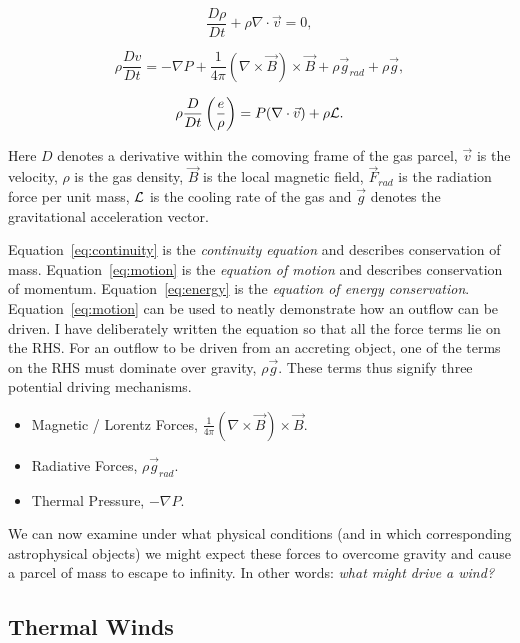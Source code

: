 \begin{equation}
\label{eq:continuity}
\frac{D \rho}{Dt} + \rho \nabla \cdot \vec{v} = 0,
\end{equation}

\begin{equation}
\label{eq:motion}
\rho \frac{Dv}{Dt} = -\nabla P + \frac{1}{4 \pi}(\nabla \times \vec{B}) \times \vec{B} + \rho \vec{g}_{rad} + \rho \vec{g},
\end{equation}

\begin{equation}
\label{eq:energy}
\rho \frac{D}{Dt} \left(\frac{e}{\rho}\right) = P (\nabla \cdot \vec{v}) + \rho \cal{L}.
\end{equation}

Here $D$ denotes a derivative within the comoving frame of the gas parcel, $\vec{v}$ is the velocity,
$\rho$ is the gas density, $\vec{B}$ is the local magnetic field, 
$\vec{F}_{rad}$ is the radiation
force per unit mass, $\cal{L}$ is the cooling rate of the gas 
and $\vec{g}$ denotes the gravitational acceleration vector.

Equation~\ref{eq:continuity} is the {\em continuity equation} and describes conservation of mass. 
Equation~\ref{eq:motion} is the {\em equation of motion} and describes conservation of momentum.
Equation~\ref{eq:energy} is the {\em equation of energy conservation}. 
Equation~\ref{eq:motion} can be used to neatly demonstrate how an outflow can be driven. I have 
deliberately written the equation so that all the force terms lie on the RHS. 
For an outflow to be driven from an accreting object, one of the terms on the RHS must
dominate over gravity, $\rho \vec{g}$. These terms thus signify three potential
driving mechanisms.

\begin{itemize}
	\item Magnetic / Lorentz Forces, $\frac{1}{4 \pi}(\nabla \times \vec{B}) \times \vec{B}$.
	\item Radiative Forces, $\rho \vec{g}_{rad}$.
	\item Thermal Pressure, $-\nabla P$.
\end{itemize}

We can now examine under what physical conditions 
(and in which corresponding astrophysical objects)
we might expect these forces to overcome gravity and 
cause a parcel of mass to escape to infinity.
In other words: {\em what might drive a wind?}

\subsection{Thermal Winds}

